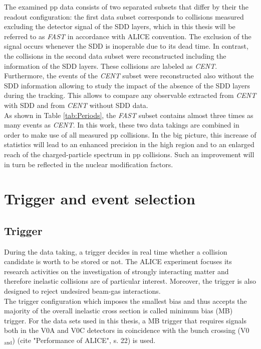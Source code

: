 \documentclass[12pt,a4paper]{report}
\begin{document}
The examined pp data consists of two separated subsets that differ by their the readout configuration: the first data subset corresponds to collisions measured excluding the detector signal of the SDD layers, which in this thesis will be referred to as \textit{FAST} in accordance with ALICE convention. The exclusion of the signal occurs whenever the SDD is inoperable due to its dead time. In contrast, the collisions in the second data subset were reconstructed including the information of the SDD layers. These collisions are labeled as \textit{CENT}. Furthermore, the events of the \textit{CENT} subset were reconstructed also without the SDD information allowing to study the impact of the absence of the SDD layers during the tracking. This allows to compare any observable extracted from \textit{CENT} with SDD and from \textit{CENT} without SDD data. \\
As shown in Table \ref{tab:Periods}, the \textit{FAST} subset contains almost three times as many events as \textit{CENT}. In this work, these two data takings are combined in order to make use of all measured pp collisions. In the big picture, this increase of statistics will lead to an enhanced precision in the high \pt region and to an enlarged \pt reach of the charged-particle \pt spectrum in pp collisions. Such an improvement will in turn be reflected in the nuclear modification factors. 
\section{Trigger and event selection}
\subsection{Trigger}
During the data taking, a trigger decides in real time whether a collision candidate is worth to be stored or not. The ALICE experiment focuses its research activities on the investigation of strongly interacting matter and therefore inelastic collisions are of particular interest. Moreover, the trigger is also designed to reject undesired beam-gas interactions. \\
The trigger configuration which imposes the smallest bias and thus accepts the majority of the overall inelastic cross section is called minimum bias (MB) trigger. For the data sets used in this thesis, a MB trigger that requires signals both in the V0A and V0C detectors in coincidence with the bunch crossing (V0$_\text{and}$) (cite "Performance of ALICE", s. 22) is used.
\end{document}
